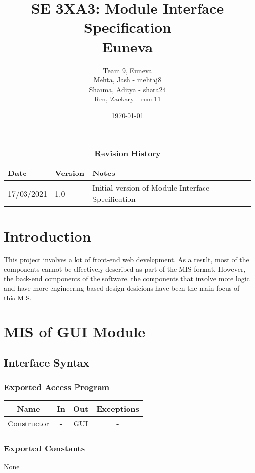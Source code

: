 \documentclass[12pt, titlepage]{article}
\title{SE 3XA3: Module Interface Specification\\Euneva}
\author{Team 9, Euneva
		\\ Mehta, Jash - mehtaj8
		\\ Sharma, Aditya - shara24
		\\ Ren, Zackary - renx11
}
\date{\today}
\begin{document}
\maketitle

\tableofcontents
\listoftables
\listoffigures

\begin{table}[bp]
\caption{\bf Revision History}
\begin{tabularx}{\textwidth}{p{3cm}p{2cm}X}
\toprule {\bf Date} & {\bf Version} & {\bf Notes}\\
\midrule
17/03/2021 & 1.0 & Initial version of Module Interface Specification\\
\bottomrule
\end{tabularx}
\end{table}

\newpage

\section{Introduction}
This project involves a lot of front-end web development. As a result,
most of the components cannot be effectively described as part of the MIS format.
However, the back-end components of the software, the components that involve
more logic and have more engineering based design desicions have been the main
focus of this MIS.

\newpage

\section{MIS of GUI Module}
\subsection{Interface Syntax}
\subsubsection{Exported Access Program}
\begin{tabular}[pos]{|c|c|c|c|}
    \hline
    \textbf{Name}& \textbf{In} & \textbf{Out} & \textbf{Exceptions} \\ \hline
    Constructor & - & GUI & -\\ \hline
\end{tabular}
\subsubsection{Exported Constants}
None
\end{document}
